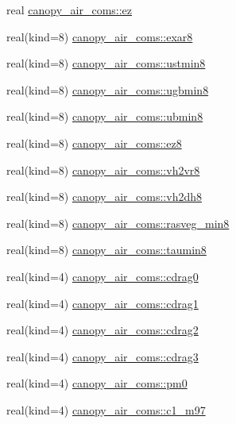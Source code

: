 \begin{DoxyCompactItemize}
\item 
real \hyperlink{namespacecanopy__air__coms_a63a4c7242b97f72a903fa4c1213b37f0}{canopy\+\_\+air\+\_\+coms\+::ez}
\item 
real(kind=8) \hyperlink{namespacecanopy__air__coms_ab6719dfbc2c9e8e2f9eddf3bf6f97237}{canopy\+\_\+air\+\_\+coms\+::exar8}
\item 
real(kind=8) \hyperlink{namespacecanopy__air__coms_a4afb828f3fecdf23a54cd6276f714544}{canopy\+\_\+air\+\_\+coms\+::ustmin8}
\item 
real(kind=8) \hyperlink{namespacecanopy__air__coms_a96ad2cd68341db7649720ebd90eab97f}{canopy\+\_\+air\+\_\+coms\+::ugbmin8}
\item 
real(kind=8) \hyperlink{namespacecanopy__air__coms_a436ed31f3d8eafc708115bca8ee30d03}{canopy\+\_\+air\+\_\+coms\+::ubmin8}
\item 
real(kind=8) \hyperlink{namespacecanopy__air__coms_a7899b1f4a3a40f367c48fbaa9b7f2ccd}{canopy\+\_\+air\+\_\+coms\+::ez8}
\item 
real(kind=8) \hyperlink{namespacecanopy__air__coms_a5425e68f350bd521634e2dec3df419cc}{canopy\+\_\+air\+\_\+coms\+::vh2vr8}
\item 
real(kind=8) \hyperlink{namespacecanopy__air__coms_aee89a61c55f84edfb62d0b236dea93c8}{canopy\+\_\+air\+\_\+coms\+::vh2dh8}
\item 
real(kind=8) \hyperlink{namespacecanopy__air__coms_a867a9672f31a44b6def8fc0bdf4eb440}{canopy\+\_\+air\+\_\+coms\+::rasveg\+\_\+min8}
\item 
real(kind=8) \hyperlink{namespacecanopy__air__coms_a3cb44bad4430d800393ec76b7a22a782}{canopy\+\_\+air\+\_\+coms\+::taumin8}
\item 
real(kind=4) \hyperlink{namespacecanopy__air__coms_a768765793f4c4b91a6ccca6d5263ad04}{canopy\+\_\+air\+\_\+coms\+::cdrag0}
\item 
real(kind=4) \hyperlink{namespacecanopy__air__coms_a7b44abfd8d12fe84db70aab86954129c}{canopy\+\_\+air\+\_\+coms\+::cdrag1}
\item 
real(kind=4) \hyperlink{namespacecanopy__air__coms_a1b94794c69c4e42537d77c51167c842f}{canopy\+\_\+air\+\_\+coms\+::cdrag2}
\item 
real(kind=4) \hyperlink{namespacecanopy__air__coms_abaac76316a5a249db322fc990489d388}{canopy\+\_\+air\+\_\+coms\+::cdrag3}
\item 
real(kind=4) \hyperlink{namespacecanopy__air__coms_a11e1c7b747cfb7033e3bf75fe4cdd0bc}{canopy\+\_\+air\+\_\+coms\+::pm0}
\item 
real(kind=4) \hyperlink{namespacecanopy__air__coms_a1f414808e85114a30c83bdf9bbc35af6}{canopy\+\_\+air\+\_\+coms\+::c1\+\_\+m97}

\end{DoxyCompactItemize}
